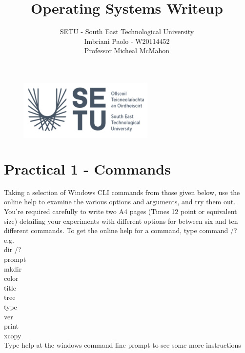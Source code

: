 \documentclass[a4paper]{article}
\title{Operating Systems Writeup}
\author{SETU - South East Technological University\\Imbriani Paolo - W20114452\\Professor Micheal McMahon}
\begin{document}
\begin{figure}
    \centering
    \includegraphics[width=0.6\textwidth]{SETU.png}
    \label{fig:centered-image}
\end{figure}

\maketitle 

\pagebreak

\tableofcontents

\pagebreak

\section{Practical 1 -  Commands}


\textcolor{green!50!black}{
Taking a selection of Windows CLI commands from those given below, use the online help to
examine the various options and arguments, and try them out.\\
You're required carefully to write two A4 pages (Times 12 point or equivalent size) detailing your experiments with different options for between six and ten different commands.
To get the online help for a command, type command /?\\
e.g.\\
dir /?\\
prompt\\
mkdir\\
color\\
title\\
tree\\
type\\
ver\\
print\\
xcopy\\
Type help at the windows command line prompt to see some more instructions
}
\end{document}
